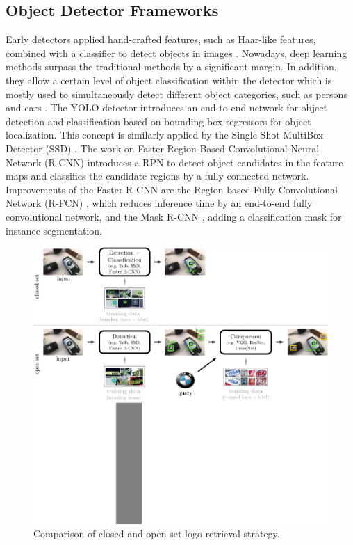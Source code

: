 \documentclass[a4paper,twoside]{article}
\begin{document}
\subsection{Object Detector Frameworks}
Early detectors applied hand-crafted features, such as Haar-like features, combined with a classifier to detect objects in images \cite{viola2004}. 
Nowadays, deep learning methods surpass the traditional methods by a significant margin. In addition, they allow a certain level of object classification within the detector which is mostly used to simultaneously detect different object categories, such as  persons and cars \cite{sermanet2013}. 
The YOLO detector \cite{redmon2015} introduces an end-to-end network for object detection and classification based on bounding box regressors for object localization. This concept is similarly applied by the Single Shot MultiBox Detector (SSD) \cite{liu2016b}. 
The work on Faster Region-Based Convolutional Neural Network (R-CNN) \cite{ren2015} introduces a \ac{RPN} to detect object candidates in the feature maps and classifies the candidate regions by a fully connected network. 
Improvements of the Faster R-CNN are the Region-based Fully Convolutional Network (R-FCN) \cite{jifengdai2016b}, which reduces inference time by an end-to-end fully convolutional network, and the Mask R-CNN \cite{he2017}, adding a classification mask for instance segmentation.
%
\begin{figure}%
\centering%
\includegraphics[width=\linewidth, trim=0cm 6.6cm 0cm 0cm, clip]{img/openset.pdf}%
\caption{Comparison of closed and open set logo retrieval strategy.}%
\label{fig:openClosedSet}
\end{figure}%
\end{document}

